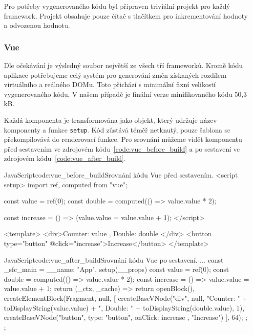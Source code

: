 \documentclass[
  master,
  program=ainf,
  tables=false,
  sourcecodes,
  glossaries,
  index
]{kidiplom}
\begin{document}
Pro potřeby vygenerovaného kódu byl připraven triviální projekt pro každý framework. 
Projekt obsahuje pouze čítač s tlačítkem pro inkrementování hodnoty a odvozenou hodnotu. 

\subsubsection{Vue}
Dle očekávání je výsledný soubor největší ze všech tří frameworků. Kromě kódu aplikace potřebujeme celý systém
pro generování změn získaných rozdílem virtuálního a reálného DOMu. Toto přichází s minimální fixní velikostí
vygenerovaného kódu. V našem případě je finální verze minifikovaného kódu 50,3 kB.

Každá komponenta je transformována jako objekt, který udržuje název komponenty a funkce {\tt setup}.
Kód zůstává téměř netknutý, pouze šablona se překompilovává
do renderovací funkce. Pro srovnání můžeme vidět komponentu před sestavením ve zdrojovém kódu~\ref{code:vue_before_build} a
po sestavení ve zdrojovém kódu~\ref{code:vue_after_build}. 

  \begin{kicode}{JavaScript}{code:vue_before_build}{Srovnání kódu Vue před sestavením.}
    <script setup>
      import { ref, computed } from "vue";

      const value = ref(0);
      const double = computed(() => value.value * 2);

      const increase = () => (value.value = value.value + 1);
    </script>

    <template>
      <div>Counter: {{ value }}, Double: {{ double }}</div>
      <button type="button" @click="increase">Increase</button>
    </template>
\end{kicode}

  \begin{kicode}{JavaScript}{code:vue_after_build}{Srovnání kódu Vue po sestavení.}
    ...
    const _sfc_main = {
      __name: "App",
      setup(__props) {
        const value = ref(0);
        const double = computed(() => value.value * 2);
        const increase = () => value.value = value.value + 1;
        return (_ctx, _cache) => {
          return openBlock(), createElementBlock(Fragment, null, [
            createBaseVNode("div", null, "Counter: " + toDisplayString(value.value) + ", Double: " + toDisplayString(double.value), 1),
            createBaseVNode("button", {
              type: "button",
              onClick: increase
            }, "Increase")
          ], 64);
        };
      }
    };
\end{kicode}
\end{document}

